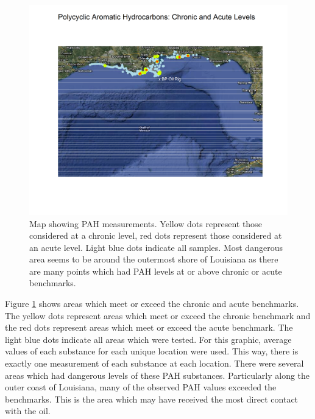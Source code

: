 \documentclass[authoryear,12pt]{elsarticle}
\begin{document}
\begin{figure}[htbp] %
   \centering
   \includegraphics[width=5in]{chron-acute-map.png} 
   \caption{Map showing PAH measurements. Yellow dots represent those considered at a chronic level, red dots represent those considered at an acute level.  Light blue dots indicate all samples.  Most dangerous area seems to be around the outermost shore of Louisiana as there are many points which had PAH levels at or above chronic or acute benchmarks.}
   \label{pah-map}
\end{figure}


Figure \ref{pah-map} shows areas which meet or exceed the chronic and acute benchmarks.  The yellow dots represent areas which meet or exceed the chronic benchmark and the red dots represent areas which meet or exceed the acute benchmark.  The light blue dots indicate all areas which were tested.  For this graphic, average values of each substance for each unique location were used.  This way, there is exactly one measurement of each substance at each location.  There were several areas which had dangerous levels of these PAH substances.  Particularly along the outer coast of Louisiana, many of the observed PAH values exceeded the benchmarks.  This is the area which may have received the most direct contact with the oil.  
\end{document}
